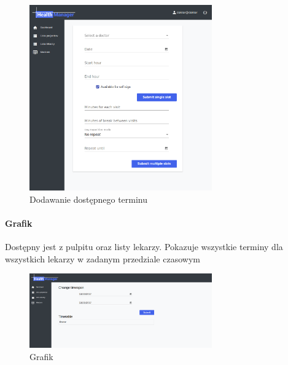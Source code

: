 \documentclass[polish,12pt]{aghthesis}
\begin{document}
{\begin{figure}[H]
          \includegraphics[width=0.7\textwidth]{gui-add-timeslot}
          \caption{Dodawanie dostępnego terminu}
        \end{figure}     
    }
    \paragraph{Grafik}{ Dostępny jest z pulpitu oraz listy lekarzy. Pokazuje wszystkie terminy dla wszystkich lekarzy w zadanym przedziale czasowym
        \begin{figure}[H]
          \includegraphics[width=0.7\textwidth]{gui-timetable}
          \caption{Grafik}
        \end{figure}        
    }
\end{document}
